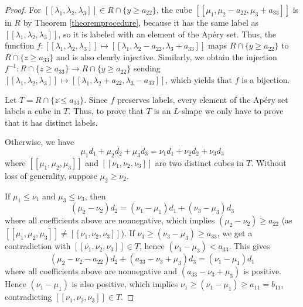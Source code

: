 \documentclass[12pt]{article}
\theoremstyle{remark}
\begin{document}
\begin{proof}
    For $[[\lambda_1,\lambda_2,\lambda_3]] \in R \cap \{y \geq a_{22}\} $, the cube $[[\mu_1,\mu_2 - a_{22},\mu_3 + a_{33}]]$ is in $R$ by Theorem \ref{theoremprocedure}, because it has the same label as $[[\lambda_1,\lambda_2,\lambda_3]]$, so it is labeled with an element of the Ap{\'e}ry set. Thus, the function $f: [[\lambda_1,\lambda_2,\lambda_3]] \mapsto [[\lambda_1,\lambda_2-a_{22},\lambda_3+a_{33}]]$ maps $R \cap \{y \geq a_{22}\}$ to $R \cap \{z \geq a_{33}\}$ and is also clearly injective. Similarly, we obtain the injection $f^{-1} : R \cap \{z \geq a_{33}\} \to R \cap \{y \geq a_{22}\} $ sending $[[\lambda_1,\lambda_2,\lambda_3]] \mapsto [[\lambda_1,\lambda_2+a_{22},\lambda_3-a_{33}]]$, which yields that $f$ is a bijection.   
    
    Let $T = R \cap \{z \leq a_{33}\}$. Since $f$ preserves labels, every element of the Ap{\'e}ry set labels a cube in $T$. Thus, to prove that $T$ is an $L$-shape we only have to prove that it has distinct labels.  
     
    Otherwise, we have
    \begin{equation}\label{propnottrick-eq1}
        \mu_1d_1 + \mu_2d_2 + \mu_3d_3 = \nu_1d_1 + \nu_2d_2 + \nu_3d_3
    \end{equation}
    where $[[\mu_1,\mu_2,\mu_3]]$ and $[[\nu_1,\nu_2,\nu_3]]$ are two distinct cubes in $T$. Without loss of generality, suppose $\mu_2 \geq \nu_2$. 
    
    If $\mu_1 \leq \nu_1$ and $\mu_3 \leq \nu_3$, then
    \begin{equation}\label{propnottrick-eq2}
         (\mu_2-\nu_2)d_2  = (\nu_1-\mu_1)d_1  + (\nu_3-\mu_3)d_3
    \end{equation}
    where all coefficients above are nonnegative, which implies $(\mu_2-\nu_2) \geq a_{22}$ (as $[[\mu_1,\mu_2,\mu_3]] \neq [[\nu_1,\nu_2,\nu_3]]$). If $\nu_3 \geq (\nu_3-\mu_3) \geq a_{33}$, we get a contradiction with $[[\nu_1,\nu_2,\nu_3]] \in T$, hence $(\nu_3-\mu_3) < a_{33}$. This gives
    \begin{equation}\label{propnottrick-eq21}
         (\mu_2-\nu_2-a_{22})d_2 + (a_{33}-\nu_3+\mu_3)d_3  = (\nu_1-\mu_1)d_1
    \end{equation}
    where all coefficients above are nonnegative and $(a_{33}-\nu_3+\mu_3)$ is positive. Hence $(\nu_1-\mu_1)$ is also positive, which implies $\nu_1 \geq (\nu_1-\mu_1) \geq a_{11} = b_{11}$, contradicting $[[\nu_1,\nu_2,\nu_3]] \in T$.


\end{proof}
\end{document}
